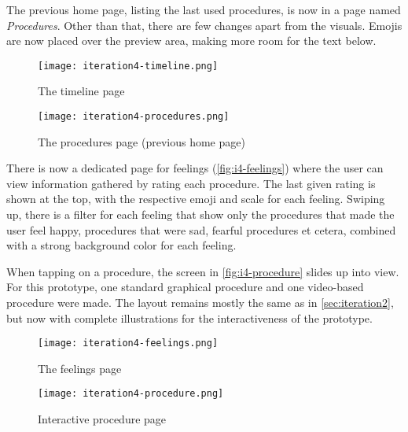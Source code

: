 The previous home page, listing the last used procedures, is now in a page named \emph{Procedures}. Other than that, there are few changes apart from the visuals. Emojis are now placed over the preview area, making more room for the text below.

\begin{figure}
    \centering
    \begin{minipage}{0.45\textwidth}
        \centering
        \texttt{[image: iteration4-timeline.png]}
        \caption{The timeline page}
        \label{fig:i4-timeline}
    \end{minipage}
    \begin{minipage}{0.45\textwidth}
        \centering
        \texttt{[image: iteration4-procedures.png]}
        \caption{The procedures page (previous home page)}
        \label{fig:i4-procedures}
    \end{minipage}
\end{figure}

There is now a dedicated page for feelings (\autoref{fig:i4-feelings}) where the user can view information gathered by rating each procedure. The last given rating is shown at the top, with the respective emoji and scale for each feeling. Swiping up, there is a filter for each feeling that show only the procedures that made the user feel happy, procedures that were sad, fearful procedures et cetera, combined with a strong background color for each feeling.

When tapping on a procedure, the screen in \autoref{fig:i4-procedure} slides up into view. For this prototype, one standard graphical procedure and one video-based procedure were made. The layout remains mostly the same as in \autoref{sec:iteration2}, but now with complete illustrations for the interactiveness of the prototype.

\begin{figure}
    \centering
    \begin{minipage}{0.45\textwidth}
        \centering
        \texttt{[image: iteration4-feelings.png]}
        \caption{The feelings page}
        \label{fig:i4-feelings}
    \end{minipage}
    \begin{minipage}{0.45\textwidth}
        \centering
        \texttt{[image: iteration4-procedure.png]}
        \caption{Interactive procedure page}
        \label{fig:i4-procedure}
    \end{minipage}
\end{figure}

